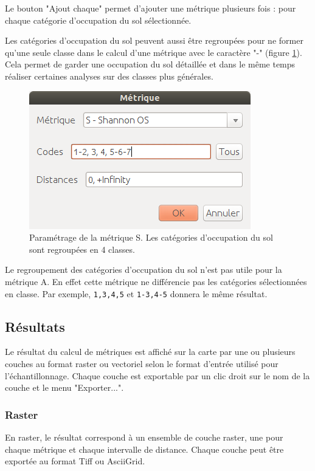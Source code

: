 \documentclass{report}
\begin{document}
Le bouton "Ajout chaque" permet d'ajouter une métrique plusieurs fois : pour chaque catégorie d'occupation du sol sélectionnée.

Les catégories d'occupation du sol peuvent aussi être regroupées pour ne former qu'une seule classe dans le calcul d'une métrique avec le caractère "-" (figure \ref{metric_param_group_dlg}). Cela permet de garder une occupation du sol détaillée et dans le même temps réaliser certaines analyses sur des classes plus générales.

\begin{figure}[H]
	\includegraphics[scale=0.5]{img/metric_param_group-fr.png} 
	\caption{Paramétrage de la métrique S. Les catégories d'occupation du sol sont regroupées en 4 classes.}
	\label{metric_param_group_dlg}
\end{figure}

Le regroupement des catégories d'occupation du sol n'est pas utile pour la métrique A. En effet cette métrique ne différencie pas les catégories sélectionnées en classe. Par exemple, \verb|1,3,4,5| et \verb|1-3,4-5| donnera le même résultat.

\subsection{Résultats}

Le résultat du calcul de métriques est affiché sur la carte par une ou plusieurs couches au format raster ou vectoriel selon le format d'entrée utilisé pour l'échantillonnage. Chaque couche est exportable par un clic droit sur le nom de la couche et le menu "Exporter...".

\subsubsection{Raster}
En raster, le résultat correspond à un ensemble de couche raster, une pour chaque métrique et chaque intervalle de distance. Chaque couche peut être exportée au format Tiff ou AsciiGrid.
\end{document}
